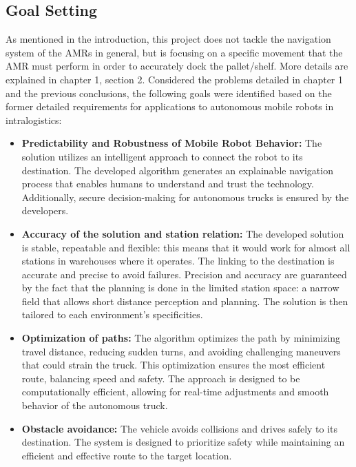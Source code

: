 \subsection{Goal Setting}
As mentioned in the introduction, this project does not tackle the navigation system of the AMRs in 
general, but is focusing on a specific movement that the AMR must perform in order to accurately dock the pallet/shelf. 
More details are explained in chapter 1, section 2.
Considered the problems detailed in chapter 1 and the previous conclusions, the following goals were identified 
based on the former detailed requirements for applications to autonomous mobile robots in intralogistics:
\begin{itemize}
    \item \textbf{Predictability and Robustness of Mobile Robot Behavior: }The solution utilizes an intelligent approach to connect 
    the robot to its destination. The developed algorithm generates an explainable navigation process that enables humans 
    to understand and trust the technology. Additionally, secure decision-making for autonomous trucks is ensured by the 
    developers. 

    \item \textbf{Accuracy of the solution and station relation: }The developed solution is stable, repeatable and flexible: this 
    means that it would work for almost all stations in warehouses where it operates. The linking to the destination is 
    accurate and precise to avoid failures. Precision and accuracy are guaranteed by the fact that the planning is done 
    in the limited station space: a narrow field that allows short distance perception and planning. The solution is 
    then tailored to each environment's specificities. 
    
    \item \textbf{Optimization of paths: }The algorithm optimizes the path by minimizing travel distance, reducing sudden turns, and avoiding challenging maneuvers that could 
    strain the truck. This optimization ensures the most efficient route, balancing speed and safety. The approach is designed to be 
    computationally efficient, allowing for real-time adjustments and smooth behavior of the autonomous truck.

    \item \textbf{Obstacle avoidance: }The vehicle avoids collisions and drives safely to its destination. The system is designed to 
    prioritize safety while maintaining an efficient and effective route to the target location.

\end{itemize}


